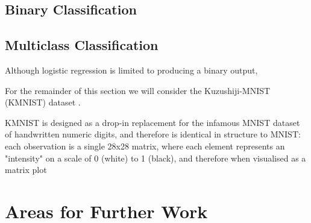 \documentclass{article}[11pt]
\begin{document}
    \subsection{Binary Classification}
    
    \subsection{Multiclass Classification}
        
        Although logistic regression is limited to producing a binary output, 
        
        
        
        For the remainder of this section we will consider the Kuzushiji-MNIST (KMNIST) dataset \cite{kmnist}. 
        
        KMNIST is designed as a drop-in replacement for the infamous MNIST dataset of handwritten numeric digits, and therefore is identical in structure to MNIST: each observation is a single 28x28 matrix, where each element represents an "intensity" on a scale of 0 (white) to 1 (black), and therefore when visualised as a matrix plot



\section{Areas for Further Work}





\end{document}

